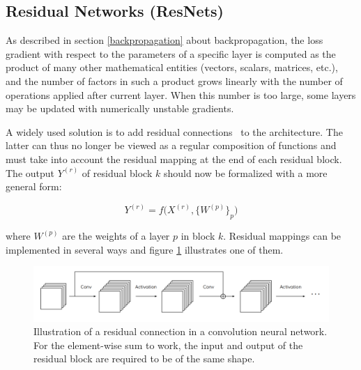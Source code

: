     \subsection{Residual Networks (ResNets)}

        As described in section \ref{backpropagation} about backpropagation,
        the loss gradient with respect to the parameters of a specific layer
        is computed as the product of many other mathematical entities
        (vectors, scalars, matrices, etc.), and the number of factors in such
        a product grows linearly with the number of operations applied after
        current layer. When this number is too large, some layers may be
        updated with numerically unstable gradients.

        A widely used solution is to add
        residual connections~\cite{DBLP:journals/corr/HeZRS15}
        to the architecture. The latter can thus no longer be viewed as
        a regular composition of functions and must take into account
        the residual mapping at the end of each residual block.
        The output $Y^{(r)}$ of residual block $k$ should now
        be formalized with a more general form:

        \begin{equation}
            Y^{(r)} = f\big(X^{(r)}, \{W^{(p)}\}_p\big)
        \end{equation}

        where $W^{(p)}$ are the weights of a layer $p$ in block $k$.
        Residual mappings can be implemented in several ways and figure \ref{resnet}
        illustrates one of them.

        \begin{figure}[H]
            \begin{center}
                \includegraphics[width=\textwidth, keepaspectratio]{imgs/resnet.png}
                \caption{Illustration of a residual connection in a convolution
                neural network. For the element-wise sum to work, the input and output
                of the residual block are required to be of the same shape.}
                \label{resnet}
            \end{center}
        \end{figure}

